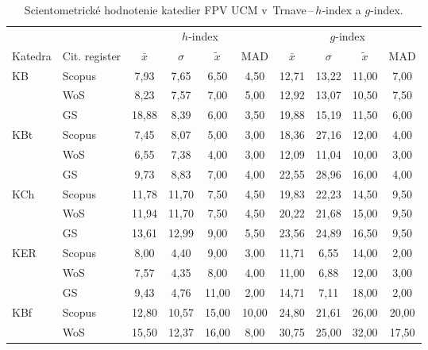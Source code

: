 \begin{table}
  \centering\small
  \caption[Hodnotenie FPV\,--\,$h$-index a $g$-index]{Scientometrické hodnotenie katedier FPV UCM v~Trnave\,--\,$h$-index a $g$-index.}
\label{tab:3-staff.results}
\begin{tabularx}{\textwidth}{XXcccc@{\hspace{3ex}}cccc}
  \toprule\noalign{\vspace{.3ex}}
       &           & \multicolumn{4}{c}{$h$-index}     & \multicolumn{4}{c}{$g$-index}    \\
  Katedra & Cit. register & $\bar{x}$      & $\sigma$  & $\tilde{x}$ & MAD  & $\bar{x}$      & $\sigma$  & $\tilde{x}$  & MAD  \\[0.3ex]
  \midrule\noalign{\vspace{.5ex}}
 KB   & Scopus & 7,93    & 7,65  & 6,50  & 4,50  & 12,71   & 13,22 & 11,00 & 7,00  \\
      & WoS    & 8,23    & 7,57  & 7,00  & 5,00  & 12,92   & 13,07 & 10,50 & 7,50  \\
      & GS     & 18,88   & 8,39  & 6,00  & 3,50  & 19,88   & 15,19 & 11,50 & 6,00  \\[3ex]
 KBt  & Scopus & 7,45    & 8,07  & 5,00  & 3,00  & 18,36   & 27,16 & 12,00 & 4,00  \\
      & WoS    & 6,55    & 7,38  & 4,00  & 3,00  & 12,09   & 11,04 & 10,00 & 3,00  \\
      & GS     & 9,73    & 8,83  & 7,00  & 4,00  & 22,55   & 28,96 & 16,00 & 4,00  \\[3ex]
 KCh  & Scopus & 11,78   & 11,70 & 7,50  & 4,50  & 19,83   & 22,23 & 14,50 & 9,50  \\
      & WoS    & 11,94   & 11,70 & 7,50  & 4,50  & 20,22   & 21,68 & 15,00 & 9,50  \\
      & GS     & 13,61   & 12,99 & 9,00  & 5,50  & 23,56   & 24,89 & 16,50 & 9,50  \\[3ex]
 KER  & Scopus & 8,00    & 4,40  & 9,00  & 3,00  & 11,71   & 6,55  & 14,00 & 2,00  \\
      & WoS    & 7,57    & 4,35  & 8,00  & 4,00  & 11,00   & 6,88  & 12,00 & 3,00  \\
      & GS     & 9,43    & 4,76  & 11,00 & 2,00  & 14,71   & 7,11  & 18,00 & 2,00  \\[3ex]
 KBf  & Scopus & 12,80   & 10,57 & 15,00 & 10,00 & 24,80   & 21,61 & 26,00 & 20,00 \\
      & WoS    & 15,50   & 12,37 & 16,00 & 8,00  & 30,75   & 25,00 & 32,00 & 17,50 \\

\end{tabularx}
\end{table}
